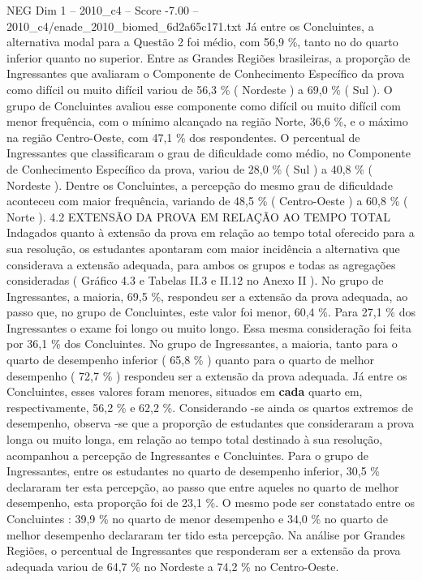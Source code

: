 \begin{textsample}{NEG Dim 1 – 2010\_c4 – Score -7.00 – 2010\_c4/enade\_2010\_biomed\_6d2a65c171.txt}
Já entre os Concluintes, a alternativa modal para a Questão 2 foi médio, com 56,9 \%, tanto no do quarto inferior quanto no superior.
Entre as Grandes Regiões brasileiras, a proporção de Ingressantes que avaliaram o Componente de Conhecimento Específico da prova como difícil ou muito difícil variou de 56,3 \% ( Nordeste ) a 69,0 \% ( Sul ).
O grupo de Concluintes avaliou esse componente como difícil ou muito difícil com menor frequência, com o mínimo alcançado na região Norte, 36,6 \%, e o máximo na região Centro-Oeste, com 47,1 \% dos respondentes.
O percentual de Ingressantes que classificaram o grau de dificuldade como médio, no Componente de Conhecimento Específico da prova, variou de 28,0 \% ( Sul ) a 40,8 \% ( Nordeste ).
Dentre os Concluintes, a percepção do mesmo grau de dificuldade aconteceu com maior frequência, variando de 48,5 \% ( Centro-Oeste ) a 60,8 \% ( Norte ). 4.2 EXTENSÃO DA PROVA EM RELAÇÃO AO TEMPO TOTAL Indagados quanto à extensão da prova em relação ao tempo total oferecido para a sua resolução, os estudantes apontaram com maior incidência a alternativa que considerava a extensão adequada, para ambos os grupos e todas as agregações consideradas ( Gráfico 4.3 e Tabelas II.3 e II.12 no Anexo II ).
No grupo de Ingressantes, a maioria, 69,5 \%, respondeu ser a extensão da prova adequada, ao passo que, no grupo de Concluintes, este valor foi menor, 60,4 \%.
Para 27,1 \% dos Ingressantes o exame foi longo ou muito longo.
Essa mesma consideração foi feita por 36,1 \% dos Concluintes.
No grupo de Ingressantes, a maioria, tanto para o quarto de desempenho inferior ( 65,8 \% ) quanto para o quarto de melhor desempenho ( 72,7 \% ) respondeu ser a extensão da prova adequada.
Já entre os Concluintes, esses valores foram menores, situados em \textbf{cada} quarto em, respectivamente, 56,2 \% e 62,2 \%.
Considerando -se ainda os quartos extremos de desempenho, observa -se que a proporção de estudantes que consideraram a prova longa ou muito longa, em relação ao tempo total destinado à sua resolução, acompanhou a percepção de Ingressantes e Concluintes.
Para o grupo de Ingressantes, entre os estudantes no quarto de desempenho inferior, 30,5 \% declararam ter esta percepção, ao passo que entre aqueles no quarto de melhor desempenho, esta proporção foi de 23,1 \%.
O mesmo pode ser constatado entre os Concluintes : 39,9 \% no quarto de menor desempenho e 34,0 \% no quarto de melhor desempenho declararam ter tido esta percepção.
Na análise por Grandes Regiões, o percentual de Ingressantes que responderam ser a extensão da prova adequada variou de 64,7 \% no Nordeste a 74,2 \% no Centro-Oeste.

\end{textsample}

